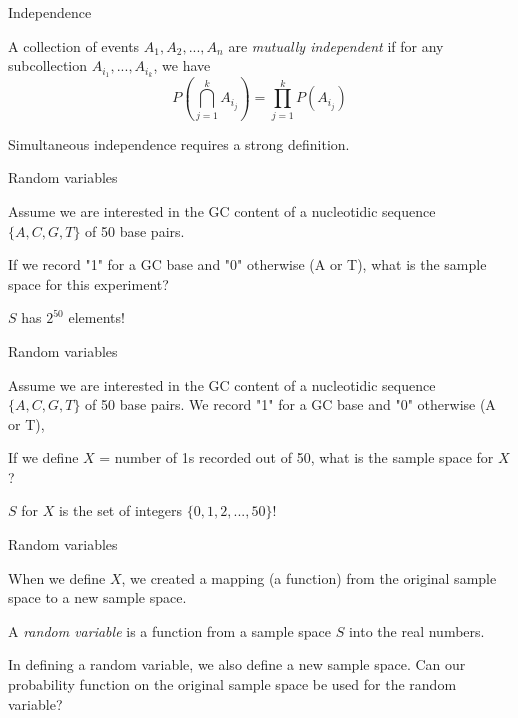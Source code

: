 \documentclass{beamer}
\begin{document}
\begin{frame}{Independence}

	\begin{block}{}
		A collection of events $A_1, A_2, ..., A_n$ are \textit{mutually independent} if for any
		subcollection $A_{i_1},...,A_{i_k}$, we have
		\begin{equation*}
			P(\bigcap_{j=1}^k A_{i_j} ) = \prod_{j=1}^k P(A_{i_j})
		\end{equation*}
	\end{block}

	Simultaneous independence requires a strong definition.

\end{frame}

\begin{frame}{Random variables}

	Assume we are interested in the GC content of a nucleotidic sequence $\{A,C,G,T\}$ of 50 base pairs.

	If we record "1" for a GC base and "0" otherwise (A or T), what is the sample space for this experiment?

	\pause

	$S$ has $2^{50}$ elements!

\end{frame}

\begin{frame}{Random variables}

        Assume we are interested in the GC content of a nucleotidic sequence $\{A,C,G,T\}$ of 50 base pairs.
        We record "1" for a GC base and "0" otherwise (A or T), 

	If we define $X$ = number of 1s recorded out of 50, what is the sample space for $X$?

        \pause

        $S$ for $X$ is the set of integers $\{0,1,2,...,50\}$!

\end{frame}

\begin{frame}{Random variables}

	When we define $X$, we created a mapping (a function) from the original sample space to a new sample space.
	\begin{block}{}
		A \textit{random variable} is a function from a sample space $S$ into the real numbers.
	\end{block}

	In defining a random variable, we also define a new sample space. 
	Can our probability function on the original sample space be used for the random variable?

\end{frame}
\end{document}
